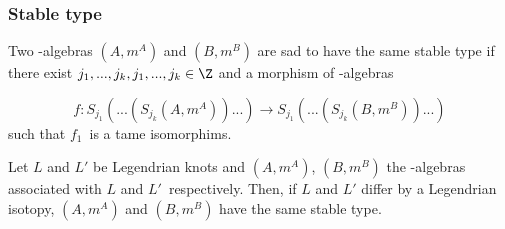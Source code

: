 \subsubsection{Stable type}
Two \Ainf-algebras $(A,m^A)$ and $(B,m^B)$
are sad to have the same stable type if there exist 
$j_1,...,j_k,j_1,...,j_k \in \Z$ and a morphism of \Ainf-algebras

\[ f: S_{j_1} (...(S_{j_k} (A, m^A))...) \to S_{j_1} (...(S_{j_k} (B, m^B))...) \] 
such that $f_1$ is a tame isomorphims.


\begin{them}
\label{prop:inv}
Let $L$ and $L'$ be Legendrian knots and $(A, m^A)$, $(B, m^B)$ the
\Ainf-algebras associated with $L$ and $L'$ respectively. 
Then, if $L$ and $L'$ differ by a Legendrian isotopy,
$(A, m^A)$ and $(B, m^B)$ have the same stable type.

\end{them}

